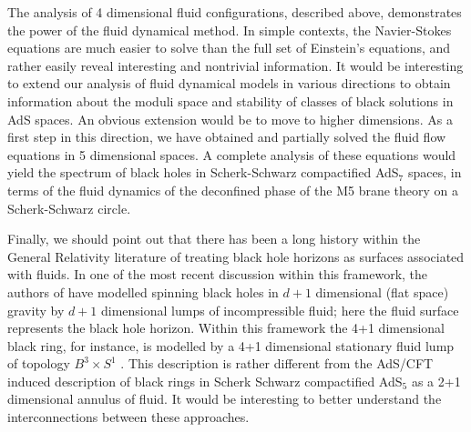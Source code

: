 The analysis of 4 dimensional fluid configurations, described above,
demonstrates the power of the fluid dynamical method. In simple
contexts, the Navier-Stokes equations are much easier to solve than
the full set of Einstein's equations, and rather easily reveal
interesting and nontrivial information. It would be interesting to
extend our analysis of fluid dynamical models in various directions
to obtain information about the moduli space and stability of
classes of black solutions in AdS spaces. An obvious extension would
be to move to higher dimensions. As a first step in this direction,
we have obtained and partially solved the fluid flow equations in 5
dimensional spaces. A complete analysis of these equations would
yield the spectrum of black holes in Scherk-Schwarz compactified
AdS$_7$ spaces, in terms of the fluid dynamics of the deconfined
phase of the M5 brane theory on a Scherk-Schwarz circle.

Finally, we should point out that there has been a long history
within the General Relativity literature of treating black hole
horizons as surfaces associated with fluids. In one of the most
recent discussion within this framework, the authors of
\cite{Cardoso:2007ka} have modelled spinning black holes in $d+1$
dimensional (flat space) gravity by $d+1$ dimensional lumps of
incompressible fluid; here the fluid surface represents the black
hole horizon. Within this framework the 4+1 dimensional black ring,
for instance, is modelled by a 4+1 dimensional stationary fluid lump
of topology $B^3\times S^1$ \cite{Cardoso:2006sj}. This description
is rather different from the AdS/CFT induced description of black
rings in Scherk Schwarz compactified AdS$_5$ as a 2+1 dimensional
annulus of fluid. It would be interesting to better understand the
interconnections between these approaches.
